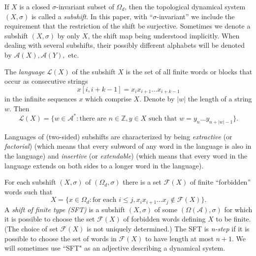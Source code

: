 \documentclass{kepart2010}
\theoremstyle{plain}
\theoremstyle{definition}
\theoremstyle{remark}
\theoremstyle{definition}
\numberwithin{equation}{section}
\begin{document}
If $X$ is a closed $\sigma$-invariant subset of $\Omega_d$, then the
topological dynamical system $(X,\sigma)$ is called a {\em
subshift}. In this paper, with ``$\sigma$-invariant'' we include
the requirement that the restriction of the shift be surjective.
Sometimes we denote a subshift $(X,\sigma)$ by only $X$,
the shift map being understood implicitly. When dealing with several
subshifts, their possibly different alphabets will be denoted by
${{\mathcal A}}(X), {{\mathcal A}}(Y),$ etc.

The {\em language} ${{\mathcal L}}(X)$ of the subshift $X$ is the set of all
finite words or blocks that occur as consecutive strings
 \begin{equation}
 x[i,i+k-1]=x_ix_{i+1}\dots x_{i+k-1}
 \end{equation}
 in the infinite sequences $x$
which comprise $X$. Denote by $|w|$ the length of a string $w$. Then
 \begin{equation}
 {{\mathcal L}}(X) = \{w \in {{\mathcal A}}^* : \text{there are  } n \in {\mathbb Z}, y \in X
 \text{ such that } w=y_n \dots y_{n+|w|-1} \}.
 \end{equation}

Languages of (two-sided) subshifts are characterized by being {\em
extractive} (or {\em factorial}) (which means that every subword of
any word in the language is also in the language) and {\em
insertive} (or {\em extendable}) (which means that every word in the
language extends on both sides to a longer word in the language).

 For each subshift
$(X,\sigma)$ of $(\Omega_d,\sigma)$ there is a set ${{\mathcal F}}(X)$ of
finite ``forbidden'' words such that \begin{equation} X=\{x \in \Omega_d :
\text{for each  } i \leq j, x_ix_{i+1}\dots x_j \notin {{\mathcal F}}(X)\} .
\end{equation} A {\em shift of finite type (SFT)} is a subshift $(X,\sigma)$ of
some $(\Omega ({{\mathcal A}}),\sigma)$ for which it is possible to choose the
set ${{\mathcal F}}(X)$ of forbidden words defining $X$ to be finite. (The
choice of set ${{\mathcal F}}(X)$ is not uniquely determined.) The SFT is {\it
n-step} if it is possible to choose the set of words in ${{\mathcal F}}(X)$ to
have length at most $n+1$.
  {
  We will sometimes use ``SFT" as an
adjective describing a dynamical system.}
\end{document}
